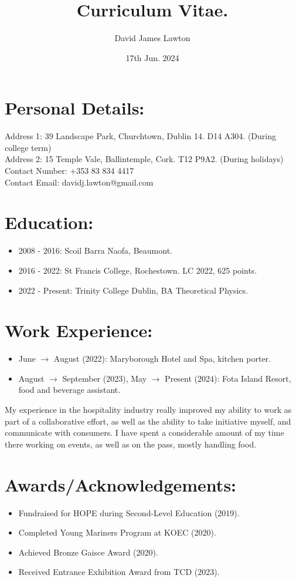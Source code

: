 \documentclass{article}
\title{Curriculum Vitae.}
\author{David James Lawton}
\date{17th Jun. 2024}
\begin{document}
\maketitle

\section{Personal Details:}
Address 1: 39 Landscape Park, Churchtown, Dublin 14. D14 A304. (During college term)\\
Address 2: 15 Temple Vale, Ballintemple, Cork. T12 P9A2. (During holidays)\\
Contact Number: +353 83 834 4417\\
Contact Email: davidj.lawton@gmail.com\\

\section{Education:}
\begin{itemize}
\item 2008 - 2016: Scoil Barra Naofa, Beaumont.
\item 2016 - 2022: St Francis College, Rochestown. LC 2022, 625 points.
\item 2022 - Present: Trinity College Dublin, BA Theoretical Physics. 
\end{itemize}
\section{Work Experience:}
\begin{itemize}
\item June $\rightarrow$ August (2022): Maryborough Hotel and Spa, kitchen porter. 
\item August $\rightarrow$  September (2023), May $\rightarrow$ Present (2024): Fota Island Resort, food and beverage assistant.
\end{itemize}
My experience in the hospitality industry really improved my ability to work as part of a collaborative effort, as well as the ability to take initiative myself, and communicate with consumers. I have spent a considerable amount of my time there working on events, as well as on the pass, mostly handling food.
\section{Awards/Acknowledgements:}
\begin{itemize}
\item Fundraised for HOPE during Second-Level Education (2019).
\item Completed Young Mariners Program at KOEC (2020).
\item Achieved Bronze Gaisce Award (2020).
\item Received Entrance Exhibition Award from TCD (2023).
\end{itemize}
\end{document}
